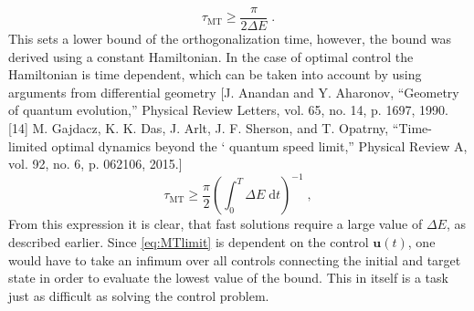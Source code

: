 \begin{equation}
	\tau_{\mathrm{MT}} \geq \frac{\pi}{2 \Delta E} \; .
\end{equation}
This sets a lower bound of the orthogonalization time, however, the bound was derived using a constant Hamiltonian. In the case of optimal control the Hamiltonian is time dependent, which can be taken into account by using arguments from differential geometry [J. Anandan and Y. Aharonov, “Geometry of quantum evolution,” Physical Review Letters, vol. 65, no. 14,
p. 1697, 1990.
[14] M. Gajdacz, K. K. Das, J. Arlt, J. F. Sherson, and T. Opatrny, “Time-limited optimal dynamics beyond the `
quantum speed limit,” Physical Review A, vol. 92, no. 6, p. 062106, 2015.]
\begin{equation}
	\tau_{\mathrm{MT}} \geq \frac{\pi}{2} \left( \int_{0}^{T} \Delta E \; \mathrm{d}t \right) ^{-1} \; , \label{eq:MTlimit}
\end{equation}
From this expression it is clear, that fast solutions require a large value of $\Delta E$, as described earlier. Since \ref{eq:MTlimit} is dependent on the control $\boldsymbol{u}(t)$, one would have to take an infimum over all controls connecting the initial and target state in order to evaluate the lowest value of the bound. This in itself is a task just as difficult as solving the control problem.


